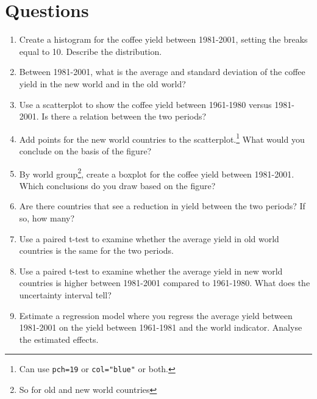 \documentclass{tufte-handout}
\begin{document}
\section{Questions}
\begin{enumerate}
  \item Create a histogram for the coffee yield between 1981-2001, setting the breaks equal to 10. Describe the distribution. 
  \item Between 1981-2001, what is the average and standard deviation of the coffee yield in the new world and in the old world?
  \item Use a scatterplot to show the coffee yield between 1961-1980 versus 1981-2001. Is there a relation between the two periods?
  \item Add points for the new world countries to the scatterplot.\footnote{Can use \texttt{pch=19} or \texttt{col="blue"} or both.} What would you conclude on the basis of the figure?
  \item By world group\footnote{So for old and new world countries}, create a boxplot for the coffee yield between 1981-2001. Which conclusions do you draw based on the figure?
  \item Are there countries that see a reduction in yield between the two periods? If so, how many?
  \item Use a paired t-test to examine whether the average yield in old world countries is the same for the two periods.
  \item Use a paired t-test to examine whether the average yield in new world countries is higher between 1981-2001 compared to 1961-1980. What does the uncertainty interval tell?  
  \item Estimate a regression model where you regress the average yield between 1981-2001 on the yield between 1961-1981 and the world indicator. Analyse the estimated effects.
\end{enumerate}
\end{document}

